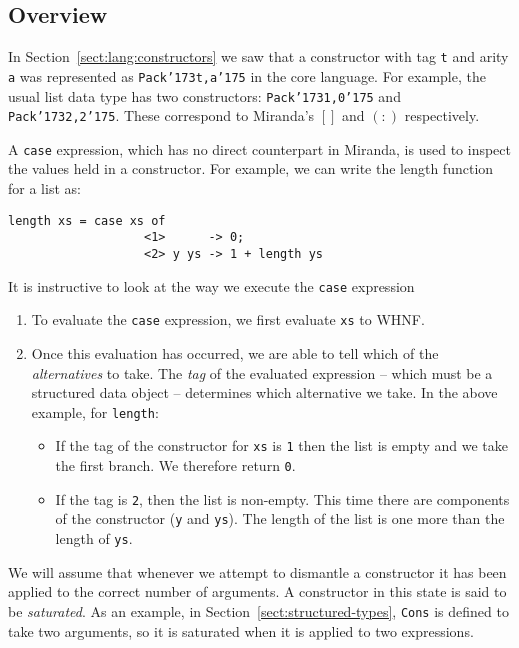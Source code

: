 \subsection{Overview}

In Section~\ref{sect:lang:constructors} we saw that a constructor with
tag \mbox{\tt t} and arity \mbox{\tt a} was represented as \mbox{\tt Pack{\char'173}t,a{\char'175}} in the core
language. For example, the usual list data type has two constructors:
\mbox{\tt Pack{\char'173}1,0{\char'175}} and \mbox{\tt Pack{\char'173}2,2{\char'175}}. These correspond to Miranda's $[]$ and
$(:)$ respectively.

A \mbox{\tt case} expression, which has no direct counterpart in Miranda, is
used to inspect the values held in a constructor. For example, we
can write the length function for a list as:
\begin{verbatim}
length xs = case xs of
                   <1>      -> 0;
                   <2> y ys -> 1 + length ys
\end{verbatim}
It is instructive to look at the way we execute the \mbox{\tt case} expression
\begin{enumerate}

\item To evaluate the \mbox{\tt case} expression, we first evaluate \mbox{\tt xs} to
WHNF.  

\item Once this evaluation has occurred, we are able to tell which of
the {\em alternatives\/} to
take. The {\em tag\/} of the evaluated
expression -- which must be a structured data object -- determines
which alternative we take. In the above example, for \mbox{\tt length}:

\begin{itemize}

\item If the tag of the constructor for \mbox{\tt xs} is \mbox{\tt 1} then the list is
empty and we take the first branch. We therefore return \mbox{\tt 0}.

\item If the tag is \mbox{\tt 2}, then the list is non-empty. This time there
are components of the constructor (\mbox{\tt y} and \mbox{\tt ys}). The length of
the list is one more than the length of \mbox{\tt ys}.
\end{itemize}
\end{enumerate}
We will assume that whenever we attempt to dismantle a constructor it
has been applied to the correct number of arguments. A constructor in
this state is said to be {\em saturated}.
As an example, in Section~\ref{sect:structured-types}, \mbox{\tt Cons} is
defined to take two arguments, so it is saturated when it is applied
to two expressions.


